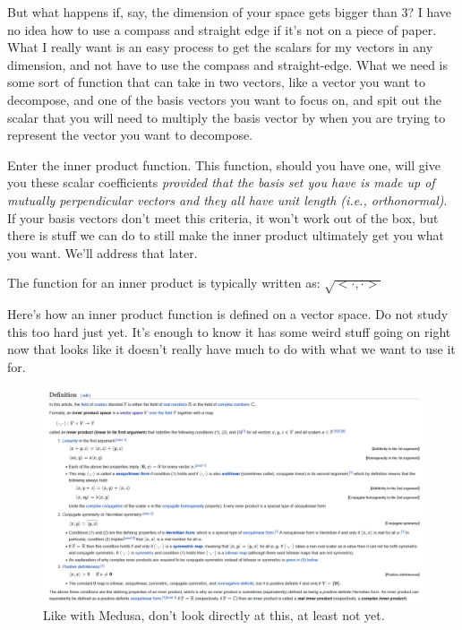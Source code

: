 \documentclass[
]{book}
\begin{document}
But what happens if, say, the dimension of your space gets bigger than 3? I have no idea how to use a compass and straight edge if it's not on a piece of paper. What I really want is an easy process to get the scalars for my vectors in any dimension, and not have to use the compass and straight-edge. What we need is some sort of function that can take in two vectors, like a vector you want to decompose, and one of the basis vectors you want to focus on, and spit out the scalar that you will need to multiply the basis vector by when you are trying to represent the vector you want to decompose.

Enter the inner product function. This function, should you have one, will give you these scalar coefficients \emph{provided that the basis set you have is made up of mutually perpendicular vectors and they all have unit length (i.e., orthonormal)}. If your basis vectors don't meet this criteria, it won't work out of the box, but there is stuff we can do to still make the inner product ultimately get you what you want. We'll address that later.

The function for an inner product is typically written as: \(\sqrt{<\cdot,\cdot>}\)

Here's how an inner product function is defined on a vector space. Do not study this too hard just yet. It's enough to know it has some weird stuff going on right now that looks like it doesn't really have much to do with what we want to use it for.

\begin{figure}

{\centering \includegraphics[width=1\linewidth,height=1\textheight]{images/inner-product-definition-wikipedia} 

}

\caption{Like with Medusa, don't look directly at this, at least not yet.}\label{fig:unnamed-chunk-6}
\end{figure}
\end{document}
